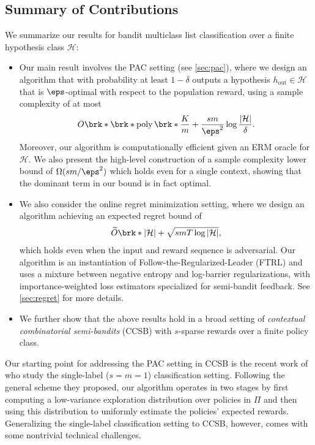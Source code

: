 \documentclass[11pt]{article}
\newcommand{\poly}{\operatorname{poly}}
\newcommand{\hout}{h_{\mathrm{out}}}
\newcommand{\calH}{\mathcal{H}}
\theoremstyle{plain}
\begin{document}
\subsection{Summary of Contributions}

We summarize our results for bandit multiclass list classification over a finite hypothesis class $\calH$:
% 
\begin{itemize}[leftmargin=3ex]
    \item Our main result involves the PAC setting (see \cref{sec:pac}), where we design an algorithm that with probability at least $1-\delta$ outputs a hypothesis $\hout \in \calH$ that is $\eps$-optimal with respect to the population reward, using a sample complexity of at most
    \begin{align*}
        O \brk*{\brk*{\poly \brk*{\frac{K}{m}} + \frac{sm}{\eps^2}}\log \frac{|\calH|}{\delta}}.
    \end{align*}
    Moreover, our algorithm is computationally efficient given an ERM oracle for $\calH$. We also present the high-level construction of a sample complexity lower bound of $\Omega(sm / \eps^2)$ which holds even for a single context, showing that the dominant term in our bound is in fact optimal. 

    \item We also consider the online regret minimization setting, where we design an algorithm achieving an expected regret bound of
    \begin{align*}
        \widetilde O \brk*{|\calH| + \sqrt{smT \log |\calH|}},
    \end{align*}
    which holds even when the input and reward sequence is adversarial. Our algorithm is an instantiation of Follow-the-Regularized-Leader (FTRL) and uses a mixture between negative entropy and log-barrier regularizations, with importance-weighted loss estimators specialized for semi-bandit feedback. See \cref{sec:regret} for more details.

    \item 
    We further show that the above results hold 
    in a broad setting of \emph{contextual combinatorial semi-bandits} (CCSB) with $s$-sparse rewards over a finite policy class.
\end{itemize}
% 
Our starting point for addressing the PAC setting in CCSB is the recent work of \cite{erez2024fast} who study the single-label ($s=m=1$) classification setting. Following the general scheme they proposed, our algorithm operates in two stages by first computing a low-variance exploration distribution over policies in $\Pi$ and then using this distribution to uniformly estimate the policies' expected rewards. Generalizing the single-label classification setting to CCSB, however, comes with some nontrivial technical challenges. 
\end{document}
